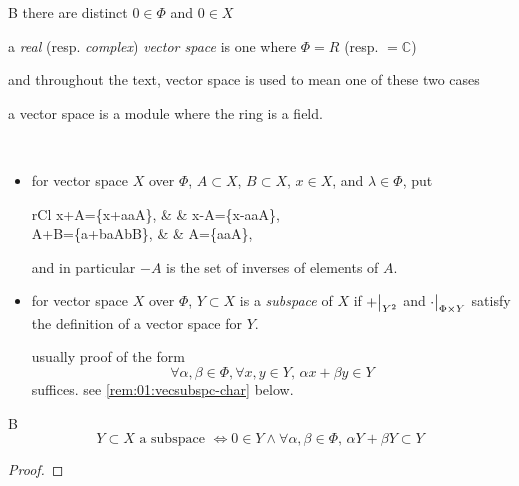 \begin{rem}{B}
  there are distinct ${0\in\Phi}$ and ${0\in X}$
\end{rem}

\begin{defn}
  a \emph{real} (resp. \emph{complex}) \emph{vector space}
  is one where ${\Phi=R}$ (resp. ${=\mathbb{C}}$)

  and throughout the text, vector space is used to mean one of these
  two cases
\end{defn}

\begin{addcomment}
  a vector space is a module where the ring is a field.
\end{addcomment}

\begin{defn}\
  \begin{itemize}
  \item
    for vector space $X$ over $\Phi$, ${A\subset X}$, ${B\subset X}$,
    ${x\in X}$, and ${\lambda\in\Phi}$, put
    \begin{IEEEeqnarray*}{rCl}
      x+A=\{x+a\mid a\in A\}, & \quad & x-A=\{x-a\mid a\in A\}, \\
      A+B=\{a+b\mid a\in A\land b\in B\}, & \quad &
      \lambda A=\{\lambda a\mid a\in A\},
    \end{IEEEeqnarray*}
    and in particular ${-A}$ is the set of inverses of elements of $A$.
  \item
    for vector space $X$ over $\Phi$, ${Y\subset X}$ is a
    \emph{subspace} of $X$ if $\restr{+}{Y^2}$ and
    $\restr{\cdot}{\Phi\times Y}$ satisfy the definition
    of a vector space for $Y$.
    \begin{addcomment}
      usually proof of the form
      \[
      \forall \alpha,\beta\in\Phi,\forall x,y\in Y,\,
      \alpha x+\beta y\in Y
      \]
      suffices.  see \ref{rem:01:vecsubspc-char} below.
    \end{addcomment}
  \end{itemize}
\end{defn}

\begin{rem}{B}\label{rem:01:vecsubspc-char}
  \[
  Y\subset X\text{ a subspace }
  \iff
  0\in Y\land \forall\alpha,\beta\in\Phi,\, \alpha Y+\beta Y\subset Y
  \]
\end{rem}
\begin{proof}
\end{proof}

